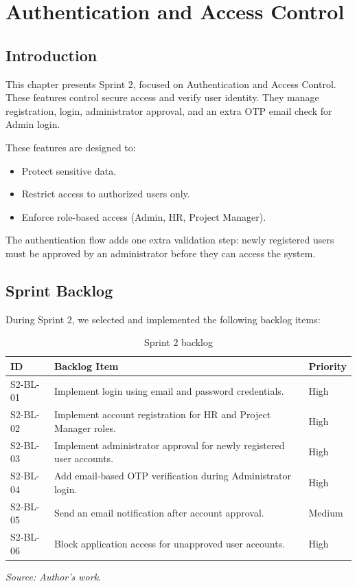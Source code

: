 \chapter{Authentication and Access Control}
\minitoc
\clearpage
\section{Introduction}
This chapter presents Sprint 2, focused on Authentication and Access Control. These features control secure access and verify user identity. They manage registration, login, administrator approval, and an extra OTP email check for Admin login.

These features are designed to:
\begin{itemize}[noitemsep]
	\item Protect sensitive data.
	\item Restrict access to authorized users only.
	\item Enforce role-based access (Admin, HR, Project Manager).
\end{itemize}

The authentication flow adds one extra validation step: newly registered users must be approved by an administrator before they can access the system.

\section{Sprint Backlog}
During Sprint 2, we selected and implemented the following backlog items:

\begin{table}[H]
	\centering
	\renewcommand{\arraystretch}{1.2}
	\begin{tabular}{|l|>{\raggedright\arraybackslash}p{9.2cm}|l|}
		\hline
		\textbf{ID} & \textbf{Backlog Item} & \textbf{Priority} \\
		\hline
		S2-BL-01 & Implement login using email and password credentials. & High \\
		\hline
		S2-BL-02 & Implement account registration for HR and Project Manager roles. & High \\
		\hline
		S2-BL-03 & Implement administrator approval for newly registered user accounts. & High \\
		\hline
		S2-BL-04 & Add email-based OTP verification during Administrator login. & High \\
		\hline
		S2-BL-05 & Send an email notification after account approval. & Medium \\
		\hline
		S2-BL-06 & Block application access for unapproved user accounts. & High \\
		\hline
	\end{tabular}
	\caption{Sprint 2 backlog}
	\label{tab:sprint-2-backlog}
	{\footnotesize\textit{Source: Author's work.}}
\end{table}

